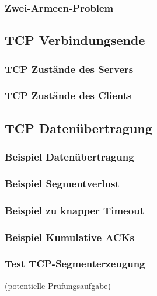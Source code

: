 \subsubsection{Zwei-Armeen-Problem}

\subsection{TCP Verbindungsende}
\subsubsection{TCP Zustände des Servers}
\subsubsection{TCP Zustände des Clients}

\subsection{TCP Datenübertragung}
\subsubsection{Beispiel Datenübertragung}
\subsubsection{Beispiel Segmentverlust}
\subsubsection{Beispiel zu knapper Timeout}
\subsubsection{Beispiel Kumulative ACKs}

\subsubsection{Test TCP-Segmenterzeugung}
(potentielle Prüfungsaufgabe)

